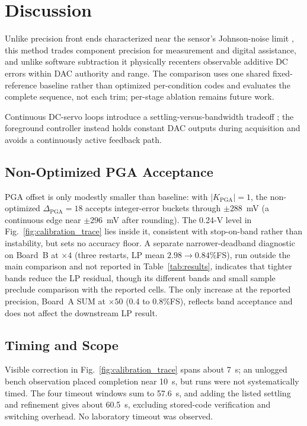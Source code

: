 \section{Discussion}
\label{sec:discussion}

Unlike precision front ends characterized near the sensor's Johnson-noise limit \cite{Kirchhoff2017}, this method trades component precision for measurement and digital assistance, and unlike software subtraction it physically recenters observable additive DC errors within DAC authority and range. The comparison uses one shared fixed-reference baseline rather than optimized per-condition codes and evaluates the complete sequence, not each trim; per-stage ablation remains future work.

Continuous DC-servo loops introduce a settling-versus-bandwidth tradeoff \cite{Liu2020}; the foreground controller instead holds constant DAC outputs during acquisition and avoids a continuously active feedback path.

\subsection{Non-Optimized PGA Acceptance}
\label{sec:pga-note}

PGA offset is only modestly smaller than baseline: with $|K_{\mathrm{PGA}}|=1$, the non-optimized $\Delta_{\mathrm{PGA}}=18$ accepts integer-error buckets through $\pm288$~mV (a continuous edge near $\pm296$~mV after rounding). The 0.24-V level in Fig.~\ref{fig:calibration_trace} lies inside it, consistent with stop-on-band rather than instability, but sets no accuracy floor. A separate narrower-deadband diagnostic on Board~B at $\times4$ (three restarts, LP mean $2.98\to0.84$\%FS), run outside the main comparison and not reported in Table~\ref{tab:results}, indicates that tighter bands reduce the LP residual, though its different bands and small sample preclude comparison with the reported cells. The only increase at the reported precision, Board~A SUM at $\times50$ (0.4 to 0.8\%FS), reflects band acceptance and does not affect the downstream LP result.

\subsection{Timing and Scope}

Visible correction in Fig.~\ref{fig:calibration_trace} spans about 7~s; an unlogged bench observation placed completion near 10~s, but runs were not systematically timed. The four timeout windows sum to 57.6~s, and adding the listed settling and refinement gives about 60.5~s, excluding stored-code verification and switching overhead. No laboratory timeout was observed.

